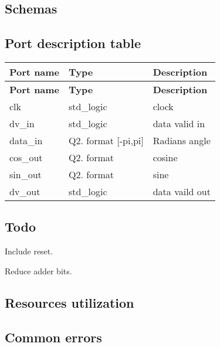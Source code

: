 \subsection*{Schemas}



\subsection*{Port description table}

\tabulinesep=1mm
\begin{longtabu} spread 0pt [c]{*{3}{|X[-1]}|}
\hline
\rowcolor{\tableheadbgcolor}\textbf{ Port name }&\textbf{ Type }&\textbf{ Description  }\\
\endfirsthead
\hline
\endfoot
\hline
\rowcolor{\tableheadbgcolor}\textbf{ Port name }&\textbf{ Type }&\textbf{ Description  }\\
\endhead
clk &std\+\_\+logic &clock \\
dv\+\_\+in &std\+\_\+logic &data valid in \\
data\+\_\+in &Q2. format \mbox{[}-\/pi,pi\mbox{]} &Radians angle \\
cos\+\_\+out &Q2. format &cosine \\
sin\+\_\+out &Q2. format &sine \\
dv\+\_\+out &std\+\_\+logic &data vaild out \\
\end{longtabu}
\subsection*{Todo}


\begin{DoxyItemize}
\item Include reset.
\item Reduce adder bits.
\end{DoxyItemize}

\subsection*{Resources utilization}

\subsection*{Common errors}